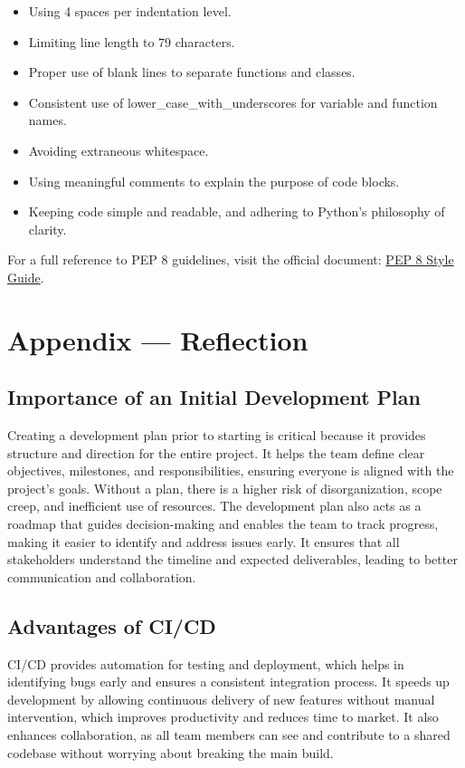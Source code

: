 \documentclass{article}
\begin{document}
\begin{itemize}
    \item Using 4 spaces per indentation level.
    \item Limiting line length to 79 characters.
    \item Proper use of blank lines to separate functions and classes.
    \item Consistent use of lower\_case\_with\_underscores for variable and function names.
    \item Avoiding extraneous whitespace.
    \item Using meaningful comments to explain the purpose of code blocks.
    \item Keeping code simple and readable, and adhering to Python’s philosophy of clarity.
    
\end{itemize}

For a full reference to PEP 8 guidelines, visit the official document: \href{https://peps.python.org/pep-0008/}{PEP 8 Style Guide}.


\newpage{}

\section*{Appendix --- Reflection}

\subsection*{Importance of an Initial Development Plan}
Creating a development plan prior to starting is critical because it provides structure and direction for the entire project. It helps the team define clear objectives, milestones, and responsibilities, ensuring everyone is aligned with the project's goals. Without a plan, there is a higher risk of disorganization, scope creep, and inefficient use of resources. The development plan also acts as a roadmap that guides decision-making and enables the team to track progress, making it easier to identify and address issues early. It ensures that all stakeholders understand the timeline and expected deliverables, leading to better communication and collaboration.

\subsection*{Advantages of CI/CD}
CI/CD provides automation for testing and deployment, which helps in identifying bugs early and ensures a consistent integration process. It speeds up development by allowing continuous delivery of new features without manual intervention, which improves productivity and reduces time to market. It also enhances collaboration, as all team members can see and contribute to a shared codebase without worrying about breaking the main build.
\end{document}
